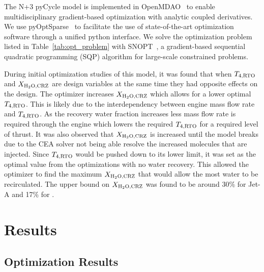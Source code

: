 \documentclass[conf]{new-aiaa}
\begin{document}
The N+3 pyCycle model is implemented in OpenMDAO~\cite{Gray2019a} to enable multidisciplinary gradient-based optimization with analytic coupled derivatives.
We use pyOptSparse~\cite{Wu2020a} to facilitate the use of state-of-the-art optimization software through a unified python interface.
We solve the optimization problem listed in Table~\ref{tab:opt_problem} with SNOPT~\cite{Gill2005a}, a gradient-based sequential quadratic programming (SQP) algorithm for large-scale constrained problems.

During initial optimization studies of this model, it was found that when $T_{4,\rm{RTO}}$ and $X_{\rm{H_2O,CRZ}}$ are design variables at the same time they had opposite effects on the design.
The optimizer increases $X_{\rm{H_2O,CRZ}}$ which allows for a lower optimal $T_{4,\rm{RTO}}$.
This is likely due to the interdependency between engine mass flow rate and $T_{4,\rm{RTO}}$.
As the recovery water fraction increases less mass flow rate is required through the engine which lowers the required $T_{4,\rm{RTO}}$ for a required level of thrust.
It was also observed that $X_{\rm{H_2O,CRZ}}$ is increased until the model breaks due to the CEA solver not being able resolve the increased  molecules that are injected.
Since $T_{4,\rm{RTO}}$ would be pushed down to its lower limit, it was set as the optimal value from the optimizations with no water recovery.
This allowed the optimizer to find the maximum $X_{\rm{H_2O,CRZ}}$ that would allow the most water to be recirculated.
The upper bound on $X_{\rm{H_2O,CRZ}}$ was found to be around 30\% for Jet-A and 17\% for .

\section{Results}
\label{sec:results}

\subsection{Optimization Results}
\label{sub:opt_res}
\end{document}
